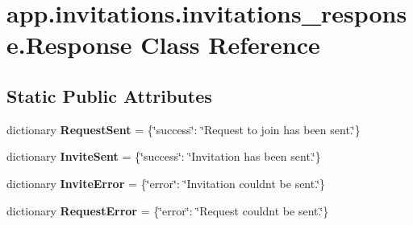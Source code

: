 \hypertarget{classapp_1_1invitations_1_1invitations__response_1_1_response}{}\section{app.\+invitations.\+invitations\+\_\+response.\+Response Class Reference}
\label{classapp_1_1invitations_1_1invitations__response_1_1_response}
\subsection*{Static Public Attributes}
\begin{DoxyCompactItemize}
\item 
\mbox{\label{classapp_1_1invitations_1_1invitations__response_1_1_response_a33401c82436ad583bf826fac51ea38fe}} 
dictionary {\bfseries Request\+Sent} = \{\char`\"{}success\char`\"{}\+: \char`\"{}Request to join has been sent.\char`\"{}\}
\item 
\mbox{\label{classapp_1_1invitations_1_1invitations__response_1_1_response_ac1caf28d14b522b72e683f5fd48c508e}} 
dictionary {\bfseries Invite\+Sent} = \{\char`\"{}success\char`\"{}\+: \char`\"{}Invitation has been sent.\char`\"{}\}
\item 
\mbox{\label{classapp_1_1invitations_1_1invitations__response_1_1_response_a8816c19a3bce020472a112ef5d9ebb1f}} 
dictionary {\bfseries Invite\+Error} = \{\char`\"{}error\char`\"{}\+: \char`\"{}Invitation couldn\textquotesingle{}t be sent.\char`\"{}\}
\item 
\mbox{\label{classapp_1_1invitations_1_1invitations__response_1_1_response_ae881d2649f530e9edce83aef8196700f}} 
dictionary {\bfseries Request\+Error} = \{\char`\"{}error\char`\"{}\+: \char`\"{}Request couldn\textquotesingle{}t be sent.\char`\"{}\}
\item 
\mbox{\label{classapp_1_1invitations_1_1invitations__response_1_1_response_ad5fa5c65dafa1bce8b8d41a696742862}} 

\end{DoxyCompactItemize}
